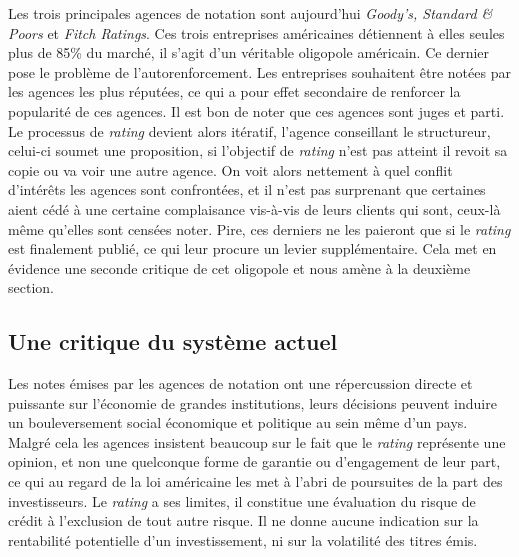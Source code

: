 \documentclass[main.tex]{subfiles}
\begin{document}
Les trois principales agences de notation sont aujourd'hui \emph{Goody's, Standard \& Poors} et \emph{Fitch Ratings}. Ces trois entreprises  américaines détiennent à elles seules plus de 85\% du marché, il s'agit d'un véritable oligopole américain.  Ce dernier pose le problème de l'autorenforcement. Les entreprises souhaitent être notées par les agences les plus réputées, ce qui a pour effet secondaire de renforcer la popularité de ces agences. Il est bon de noter que ces agences sont juges et parti. Le processus de \emph{rating} devient alors itératif, l'agence conseillant le structureur, celui-ci soumet une proposition, si l'objectif de \emph{rating} n'est pas atteint il revoit sa copie ou va voir une autre agence. On voit alors nettement à quel conflit d'intérêts les agences sont confrontées, et il n'est pas surprenant que certaines aient cédé à une certaine complaisance vis-à-vis de leurs clients qui sont, ceux-là même qu'elles sont censées noter. Pire, ces derniers ne les paieront que si le \emph{rating} est finalement publié, ce qui leur procure un levier supplémentaire. Cela met en évidence une seconde critique de cet oligopole et nous amène à la deuxième section.

\subsection{Une critique du système actuel}

Les notes émises par les agences de notation ont une répercussion directe et puissante sur l'économie de grandes institutions, leurs décisions peuvent induire un bouleversement social économique et politique au sein même d'un pays. \\
Malgré cela les agences insistent beaucoup sur le fait que le \emph{rating} représente une opinion, et non une quelconque forme de garantie ou d'engagement de leur part, ce qui au regard de la loi américaine les met à l'abri de poursuites de la part des investisseurs. Le \emph{rating} a ses limites, il constitue une évaluation du risque de crédit à l'exclusion de tout autre risque. Il ne donne aucune indication sur la rentabilité potentielle d'un investissement, ni sur la volatilité des titres émis.
\end{document}
